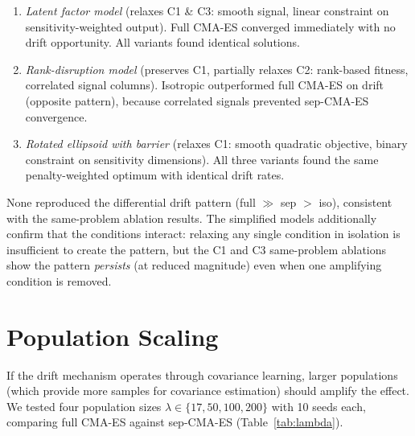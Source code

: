 \documentclass[twoside]{article}
\begin{document}
\begin{enumerate}
\item \emph{Latent factor model} (relaxes C1 \& C3: smooth signal, linear
  constraint on sensitivity-weighted output). Full CMA-ES converged immediately
  with no drift opportunity. All variants found identical solutions.

\item \emph{Rank-disruption model} (preserves C1, partially relaxes C2:
  rank-based fitness, correlated signal columns). Isotropic outperformed full
  CMA-ES on drift (opposite pattern), because correlated signals prevented
  sep-CMA-ES convergence.

\item \emph{Rotated ellipsoid with barrier} (relaxes C1: smooth quadratic
  objective, binary constraint on sensitivity dimensions). All three variants
  found the same penalty-weighted optimum with identical drift rates.
\end{enumerate}

None reproduced the differential drift pattern (full $\gg$ sep $>$ iso),
consistent with the same-problem ablation results. The simplified models
additionally confirm that the conditions interact: relaxing any
single condition in isolation is insufficient to create the pattern, but
the C1 and C3 same-problem ablations show the pattern \emph{persists} (at
reduced magnitude) even when one amplifying condition is removed.

\section{Population Scaling}
\label{sec:lambda}

If the drift mechanism operates through covariance learning, larger populations
(which provide more samples for covariance estimation) should amplify the
effect. We tested four population sizes $\lambda \in \{17, 50, 100, 200\}$
with 10 seeds each, comparing full CMA-ES against sep-CMA-ES
(Table~\ref{tab:lambda}).
\end{document}
